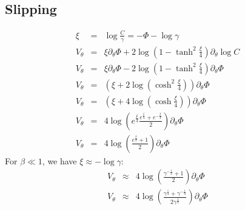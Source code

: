 \subsection{Slipping}
\begin{eqnarray}
  \xi &=& \log \frac{C}{\gamma} = -\varPhi - \log\gamma \\
  V_\theta & = & \xi \partial_\theta \varPhi
  + 2 \log\left(1 - \tanh^2 \frac{\xi}{4}\right) \partial_\theta \log C \\
  V_\theta & = & \xi \partial_\theta \varPhi
  - 2 \log\left(1 - \tanh^2 \frac{\xi}{4}\right) \partial_\theta \varPhi 
  \\ V_\theta & = & \left( \xi + 2 \log\left(\cosh^2 \frac{\xi}{4}\right) \right) \partial_\theta \varPhi
  \\ V_\theta & = & \left( \xi + 4 \log\left(\cosh \frac{\xi}{4}\right) \right) \partial_\theta \varPhi
  \\ V_\theta & = & 4 \log\left(e^\frac{\xi}{4} \frac{ e^\frac{\xi}{4} + e^{-\frac{\xi}{4}} }{2} \right) \partial_\theta \varPhi
  \\ V_\theta & = & 4 \log\left( \frac{ e^\frac{\xi}{2} + 1 }{2} \right) \partial_\theta \varPhi
\end{eqnarray}
For $\beta \ll 1$, we have $\xi \approx -\log\gamma$:
\begin{eqnarray}
  V_\theta & \approx & 4 \log\left( \frac{ \gamma^{-\frac{1}{2}} + 1 }{2} \right) \partial_\theta \varPhi \\
  V_\theta & \approx & 4 \log\left( \frac{ \gamma^{\frac{1}{4}} + \gamma^{-\frac{1}{4}} }{2 \gamma^{\frac{1}{4}}} \right) \partial_\theta \varPhi
\end{eqnarray}

